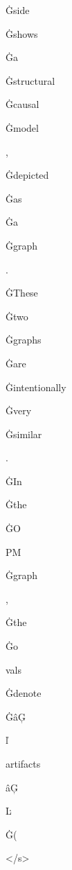 \documentclass[varwidth]{standalone}
\begin{document}
\begin{CJK*}{UTF8}{gbsn}
{{{\colorbox{red!0.16750512}{\strut Ġside} \colorbox{red!0.28251192}{\strut Ġshows} \colorbox{red!0.48102048}{\strut Ġa} \colorbox{red!0.37776393}{\strut Ġstructural} \colorbox{red!2.4307244}{\strut Ġcausal} \colorbox{red!0.3292063}{\strut Ġmodel} \colorbox{red!0.54162306}{\strut ,} \colorbox{red!0.4498341}{\strut Ġdepicted} \colorbox{red!0.42392895}{\strut Ġas} \colorbox{red!0.43312073}{\strut Ġa} \colorbox{red!0.12140007}{\strut Ġgraph} \colorbox{red!45.9906}{\strut .} \colorbox{red!0.6753566}{\strut ĠThese} \colorbox{red!0.19366308}{\strut Ġtwo} \colorbox{red!0.15111178}{\strut Ġgraphs} \colorbox{red!0.7535531}{\strut Ġare} \colorbox{red!0.56685}{\strut Ġintentionally} \colorbox{red!0.60861486}{\strut Ġvery} \colorbox{red!0.64950955}{\strut Ġsimilar} \colorbox{red!44.580887}{\strut .} \colorbox{red!0.22897106}{\strut ĠIn} \colorbox{red!0.265988}{\strut Ġthe} \colorbox{red!0.10288825}{\strut ĠO} \colorbox{red!0.13559721}{\strut PM} \colorbox{red!0.023703156}{\strut Ġgraph} \colorbox{red!0.4911272}{\strut ,} \colorbox{red!0.1830389}{\strut Ġthe} \colorbox{red!0.107316405}{\strut Ġo} \colorbox{red!0.12744784}{\strut vals} \colorbox{red!0.39738134}{\strut Ġdenote} \colorbox{red!0.2415878}{\strut ĠâĢ} \colorbox{red!1.0986066}{\strut ľ} \colorbox{red!0.36717555}{\strut artifacts} \colorbox{red!1.2457247}{\strut âĢ} \colorbox{red!0.7521067}{\strut Ŀ} \colorbox{red!1.5594786}{\strut Ġ(} \colorbox{red!0.6373057}{\strut </s>} 
}}}
\end{CJK*}
\end{document}
